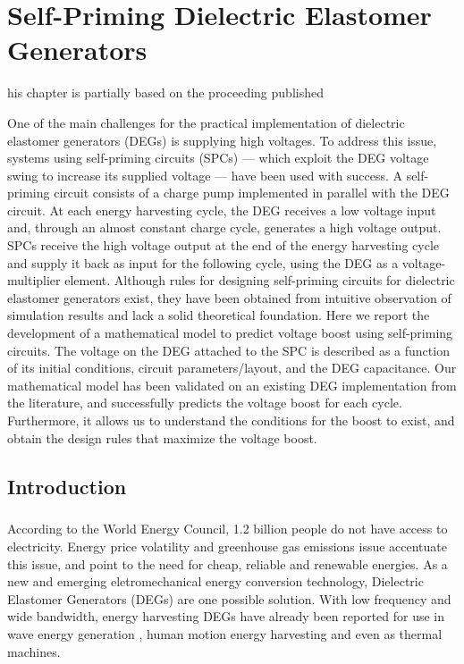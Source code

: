 %
%
\let\textcircled=\pgftextcircled
\chapter{Self-Priming Dielectric Elastomer Generators}
\label{chap:2}

his chapter is partially based on the proceeding published 

One of the main challenges for the practical implementation of dielectric elastomer generators (DEGs) is supplying high voltages. To address this issue, systems using self-priming circuits (SPCs) --- which exploit the DEG voltage swing to increase its supplied voltage --- have been used with success. 
A self-priming circuit consists of a charge pump implemented in parallel with the DEG circuit. At each energy harvesting cycle, the DEG receives a low voltage input and, through an almost constant charge cycle, generates a high voltage output. SPCs receive the high voltage output at the end of the energy harvesting cycle and supply it back as input for the following cycle, using the DEG as a voltage-multiplier element.
 Although rules for designing self-priming circuits for dielectric elastomer generators exist, they have been obtained from intuitive observation of simulation results and lack a solid theoretical foundation.
Here we report the development of a mathematical model to predict voltage boost using self-priming circuits. The voltage on the DEG attached to the SPC is described as a function of its initial conditions, circuit parameters/layout, and the DEG capacitance. Our mathematical model has been validated on an existing DEG implementation from the literature, and successfully predicts the voltage boost for each cycle. Furthermore, it allows us to understand the conditions for the boost to exist, and obtain the design rules that maximize the voltage boost.

\section{Introduction}
\label{sect:intro}  %
\paragraph{} According to the World Energy Council\cite{EnergyIssues}, 1.2 billion people do not have access to electricity. Energy price volatility and greenhouse gas emissions issue accentuate this issue, and point to the need for cheap, reliable and renewable energies.  As a new and emerging eletromechanical energy conversion technology, Dielectric Elastomer Generators (DEGs) are one possible solution. With low frequency and wide bandwidth\cite{Boots2buoys}, energy harvesting DEGs have already been reported for use in wave energy generation \cite{VertechyPolyWECtest2014}, human motion energy harvesting\cite{MistralHMotion2008} and even as thermal machines\cite{Boots2buoys}.

